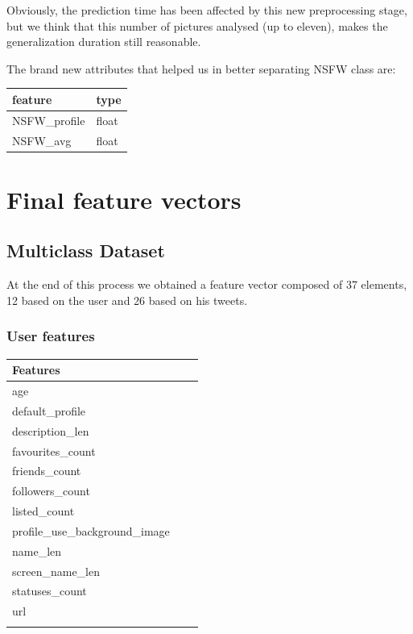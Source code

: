 Obviously, the prediction time has been affected by this new preprocessing stage, but we think that this number of pictures analysed (up to eleven), makes the generalization duration still reasonable.

The brand new attributes that helped us in better separating NSFW class are:
\small
\begin{center}
	\begin{tabular}{ll}
		\\feature&type\\
		\hline\hline
		NSFW\_profile&float\\
		NSFW\_avg&float\\\hline
	\end{tabular}
\end{center}
\normalsize

\section{Final feature vectors}
\label{sec:feature_vector}

\subsection{Multiclass Dataset}
At the end of this process we obtained a feature vector composed of 37 elements, 12 based on the user and 26 based on his tweets.

\subsubsection{User features}


\small
\begin{center}
	\begin{tabular}{lll}
		\textbf{Features}\\
		\hline\hline
		age\\
		default\_profile\\
		description\_len\\
		favourites\_count\\
		friends\_count\\
		followers\_count\\
		listed\_count\\
		profile\_use\_background\_image\\
		name\_len\\
		screen\_name\_len\\
		statuses\_count\\
		url\\
		\hline\\
		
	\end{tabular}
\end{center}
\normalsize

